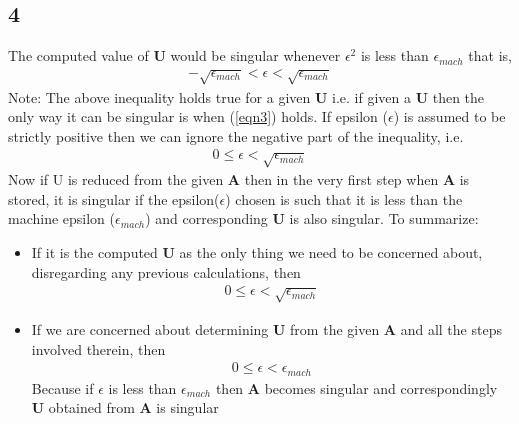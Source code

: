 \documentclass[11pt]{article}
\begin{document}
\subsection*{4}
The computed value of {\bf U} would be singular whenever ${\epsilon}^2$ is less than $\epsilon_{mach}$ that is,
\begin{align*}
- \sqrt{\epsilon_{mach}} < \epsilon < \sqrt{\epsilon_{mach}}
\label{eqn3}
\end{align*}
Note: The above inequality holds true for a given {\bf U} i.e. if given a {\bf U} then the only way it can be singular is when (\ref{eqn3}) holds. If epsilon ($\epsilon$) is assumed to be strictly positive then we can ignore the negative part of the inequality, i.e. 
\begin{align}
0 \leq \epsilon < \sqrt{\epsilon_{mach}}
\end{align}
Now if U is reduced from the given {\bf A} then in the very first step when {\bf A} is stored, it is singular if the epsilon($\epsilon$) chosen is such that it is less than the machine epsilon ($\epsilon_{mach}$) and corresponding {\bf U} is also singular. To summarize:
\begin{itemize}
\item If it is the computed {\bf U} as the only thing we need to be concerned about, disregarding any previous calculations, then
\begin{align}
0 \leq \epsilon < \sqrt{\epsilon_{mach}}
\end{align}
\item If we are concerned about determining {\bf U} from the given {\bf A} and all the steps involved therein, then 
\begin{align}
0 \leq \epsilon < \epsilon_{mach}
\end{align}
Because if $\epsilon$ is less than $\epsilon_{mach}$ then {\bf A} becomes singular and correspondingly {\bf U} obtained from {\bf A} is singular
\end{itemize}
\end{document}
